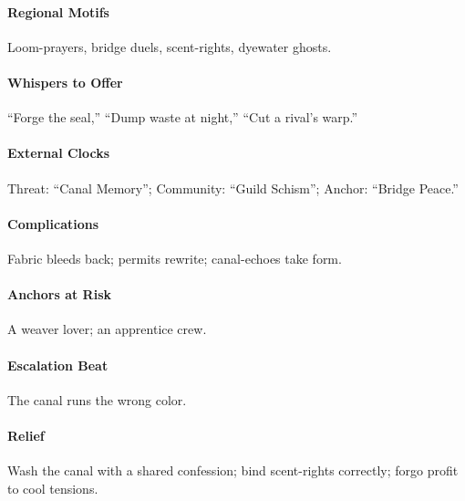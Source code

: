 \paragraph{Regional Motifs} Loom-prayers, bridge duels, scent-rights, dyewater ghosts.
\paragraph{Whispers to Offer} ``Forge the seal,'' ``Dump waste at night,'' ``Cut a rival’s warp.''
\paragraph{External Clocks} Threat: ``Canal Memory''; Community: ``Guild Schism''; Anchor: ``Bridge Peace.''
\paragraph{Complications} Fabric bleeds back; permits rewrite; canal-echoes take form.
\paragraph{Anchors at Risk} A weaver lover; an apprentice crew.
\paragraph{Escalation Beat} The canal runs the wrong color.
\paragraph{Relief} Wash the canal with a shared confession; bind scent-rights correctly; forgo profit to cool tensions.

